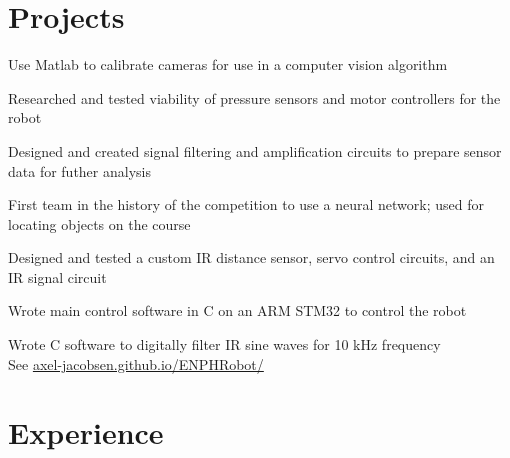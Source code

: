 \documentclass[]{deedy-resume-openfont}
\begin{document}

\section{Projects}
\begin{tightemize}
	\item Use Matlab to calibrate cameras for use in a computer vision algorithm
	\item Researched and tested viability of pressure sensors and motor controllers for the robot
	\item Designed and created signal filtering and amplification circuits to prepare sensor data for futher analysis
\end{tightemize}
\vspace{8pt}

\begin{tightemize}
	\item First team in the history of the competition to use a neural network; used for locating objects on the course
	\item Designed and tested a custom IR distance sensor, servo control circuits, and an IR signal circuit
	\item Wrote main control software in C on an ARM STM32 to control the robot
	\item Wrote C software to digitally filter IR sine waves for 10 kHz frequency \\
	See \href{https://axel-jacobsen.github.io/ENPHRobot/}{axel-jacobsen.github.io/ENPHRobot/}
\end{tightemize}
\vspace{10pt}

\section{Experience}
\end{document}

